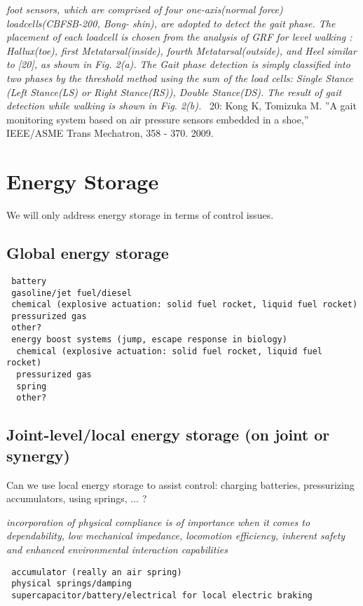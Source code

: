 \documentclass[letterpaper,12pt,fullpage]{article}
\begin{document}
{\it foot sensors, which are comprised
of four one-axis(normal force) loadcells(CBFSB-200, Bong-
shin), are adopted to detect the gait phase. The placement
of each loadcell is chosen from the analysis of GRF for
level walking : Hallux(toe), first Metatarsal(inside), fourth
Metatarsal(outside), and Heel similar to [20], as shown in
Fig. 2(a). The Gait phase detection is simply classified
into two phases by the threshold method using the sum
of the load cells: Single Stance (Left Stance(LS) or Right
Stance(RS)), Double Stance(DS). The result of gait detection
while walking is shown in Fig. 2(b).}~\cite{IEEE07222598}
20: Kong K, Tomizuka M. ”A gait monitoring system based on air pressure
sensors embedded in a shoe,” IEEE/ASME Trans Mechatron, 358 - 370.
2009.

\section{Energy Storage}

We will only address energy storage
in terms of control issues.

\subsection{Global energy storage}

\begin{verbatim}
 battery
 gasoline/jet fuel/diesel
 chemical (explosive actuation: solid fuel rocket, liquid fuel rocket)
 pressurized gas
 other?
 energy boost systems (jump, escape response in biology)
  chemical (explosive actuation: solid fuel rocket, liquid fuel rocket)
  pressurized gas
  spring
  other?
\end{verbatim}

\subsection{Joint-level/local energy storage (on joint or synergy)}

Can we use local energy storage to assist control: charging batteries,
pressurizing accumulators, using springs, ... ?

{\it incorporation of physical
compliance is of importance when it comes to dependability,
low mechanical impedance, locomotion efficiency, inherent
safety and enhanced environmental interaction capabilities}~\cite{IEEE07139975}

\begin{verbatim}
 accumulator (really an air spring)
 physical springs/damping
 supercapacitor/battery/electrical for local electric braking
\end{verbatim}
\end{document}
